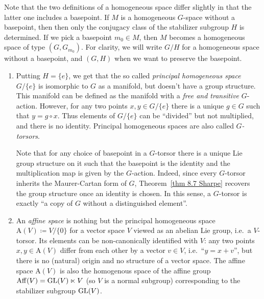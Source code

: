 Note that the two definitions of a homogeneous space differ slightly in that the latter one includes a basepoint. If $M$ is a homogeneous $G$-space without a basepoint, then then only the conjugacy class of the stabilizer subgroup $H$ is determined. If we pick a basepoint $m_0\in M$, then $M$ becomes a homogeneous space of type $(G,G_{m_0})$. For clarity, we will write $G\slash H$ for a homogeneous space without a basepoint, and $(G,H)$ when we want to preserve the basepoint.

\begin{example}\label{ex principal hom spaces}
    \begin{enumerate}
        \item Putting $H=\{e\}$, we get that the so called \emph{principal homogeneous space} $G\slash \{e\}$ is isomorphic to $G$ as a manifold, but doesn't have a group structure. This manifold can be defined as the manifold with a \emph{free and transitive} $G$-action. However, for any two points $x,y\in G\slash \{e\}$ there is a unique $g\in G$ such that $y=g\circ x$. Thus elements of $G\slash\{e\}$ can be ``divided'' but not multiplied, and there is no identity. Principal homogeneous spaces are also called \emph{$G$-torsors}. 
        
        Note that for any choice of basepoint in a $G$-torsor there is a unique Lie group structure on it such that the basepoint is the identity and the multiplication map is given by the $G$-action. Indeed, since every $G$-torsor inherits the Maurer-Cartan form of $G$, Theorem~\ref{thm 8.7 Sharpe} recovers the group structure once an identity is chosen. In this sense, a $G$-torsor is exactly ``a copy of $G$ without a distinguished element''.
        
        \item An \emph{affine space} is nothing but the principal homogeneous space $\mathrm{A}(V)\coloneqq V\slash\{0\}$ for a vector space $V$ viewed as an abelian Lie group, i.e.\ a $V$-torsor. Its elements can be non-canonically identified with $V$: any two points $x,y\in \mathrm{A}(V)$ differ from each other by a vector $v\in V$, i.e.\ ``$y=x+v$'', but there is no (natural) origin and no structure of a vector space. The affine space $\mathrm{A}(V)$ is also the homogenous space of the affine group $\operatorname{Aff}(V)=\operatorname{GL}(V)\ltimes V$ (so $V$ is a normal subgroup) corresponding to the stabilizer subgroup $\operatorname{GL}(V)$.


\end{enumerate}
\end{example}
